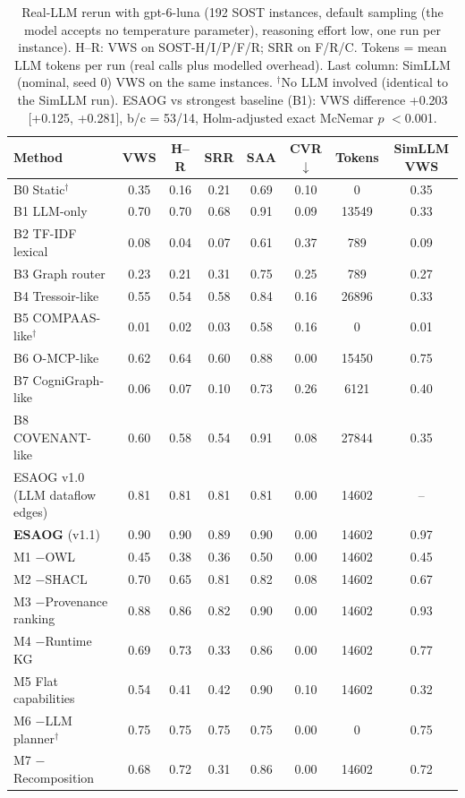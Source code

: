 \begin{table}[H]
\centering
\caption{Real-LLM rerun with gpt-6-luna (192 SOST instances, default sampling (the model accepts no temperature parameter), reasoning effort low, one run per instance). H--R: VWS on SOST-H/I/P/F/R; SRR on F/R/C. Tokens = mean LLM tokens per run (real calls plus modelled overhead). Last column: SimLLM (nominal, seed 0) VWS on the same instances. $^\dagger$No LLM involved (identical to the SimLLM run). ESAOG vs strongest baseline (B1): VWS difference +0.203 [+0.125, +0.281], b/c = 53/14, Holm-adjusted exact McNemar $p$ $<$0.001.}
\label{tab:real_gpt-6-luna}
\scriptsize
\begin{tabular}{lccccccc}
\toprule
Method & VWS & H--R & SRR & SAA & CVR$\downarrow$ & Tokens & SimLLM VWS\\
\midrule
B0 Static$^\dagger$ & 0.35 & 0.16 & 0.21 & 0.69 & 0.10 & 0 & 0.35\\
B1 LLM-only & 0.70 & 0.70 & 0.68 & 0.91 & 0.09 & 13549 & 0.33\\
B2 TF-IDF lexical & 0.08 & 0.04 & 0.07 & 0.61 & 0.37 & 789 & 0.09\\
B3 Graph router & 0.23 & 0.21 & 0.31 & 0.75 & 0.25 & 789 & 0.27\\
B4 Tressoir-like & 0.55 & 0.54 & 0.58 & 0.84 & 0.16 & 26896 & 0.33\\
B5 COMPAAS-like$^\dagger$ & 0.01 & 0.02 & 0.03 & 0.58 & 0.16 & 0 & 0.01\\
B6 O-MCP-like & 0.62 & 0.64 & 0.60 & 0.88 & 0.00 & 15450 & 0.75\\
B7 CogniGraph-like & 0.06 & 0.07 & 0.10 & 0.73 & 0.26 & 6121 & 0.40\\
B8 COVENANT-like & 0.60 & 0.58 & 0.54 & 0.91 & 0.08 & 27844 & 0.35\\
ESAOG v1.0 (LLM dataflow edges) & 0.81 & 0.81 & 0.81 & 0.81 & 0.00 & 14602 & --\\
\textbf{ESAOG} (v1.1) & 0.90 & 0.90 & 0.89 & 0.90 & 0.00 & 14602 & 0.97\\
M1 $-$OWL & 0.45 & 0.38 & 0.36 & 0.50 & 0.00 & 14602 & 0.45\\
M2 $-$SHACL & 0.70 & 0.65 & 0.81 & 0.82 & 0.08 & 14602 & 0.67\\
M3 $-$Provenance ranking & 0.88 & 0.86 & 0.82 & 0.90 & 0.00 & 14602 & 0.93\\
M4 $-$Runtime KG & 0.69 & 0.73 & 0.33 & 0.86 & 0.00 & 14602 & 0.77\\
M5 Flat capabilities & 0.54 & 0.41 & 0.42 & 0.90 & 0.10 & 14602 & 0.32\\
M6 $-$LLM planner$^\dagger$ & 0.75 & 0.75 & 0.75 & 0.75 & 0.00 & 0 & 0.75\\
M7 $-$Recomposition & 0.68 & 0.72 & 0.31 & 0.86 & 0.00 & 14602 & 0.72\\
\bottomrule
\end{tabular}
\end{table}
